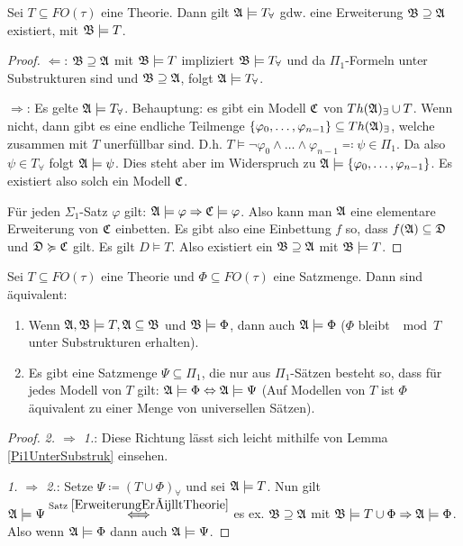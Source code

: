 \begin{satz}
	Sei $T\subseteq FO(\tau)$ eine Theorie. Dann gilt $\mathfrak{A}\models T_\forall$ gdw. eine Erweiterung $\mathfrak{B}\supseteq\mathfrak{A}$ existiert, mit $\mathfrak{B}\models T$.
	\label{ErweiterungErülltTheorie}
\end{satz}
\begin{proof}
	$\Leftarrow$: $\mathfrak{B}\supseteq\mathfrak{A}$ mit $\mathfrak{B}\models T$ impliziert $\mathfrak{B}\models T_\forall$ und da $\Pi_1$-Formeln unter Substrukturen sind und $\mathfrak{B}\supseteq\mathfrak{A}$, folgt $\mathfrak{A}\models T_\forall$.
	
	$\Rightarrow$: Es gelte $\mathfrak{A}\models T_\forall$. Behauptung: es gibt ein Modell $\mathfrak{C}$ von $Th(\mathfrak{A})_\exists\cup T$. Wenn nicht, dann gibt es eine endliche Teilmenge $\{\varphi_0,\dots,\varphi_{n-1}\}\subseteq Th(\mathfrak{A})_\exists$, welche zusammen mit $T$ unerfüllbar sind. D.h. $T\models \neg\varphi_0\land\dots\land\varphi_{n-1}\eqqcolon\psi\in\Pi_1$. Da also $\psi\in T_\forall$ folgt $\mathfrak{A}\models\psi$. Dies steht aber im Widerspruch zu $\mathfrak{A}\models\{\varphi_0,\dots,\varphi_{n-1}\}$. Es existiert also solch ein Modell $\mathfrak{C}$.
	
	Für jeden $\Sigma_1$-Satz $\varphi$ gilt: $\mathfrak{A}\models\varphi\Rightarrow\mathfrak{C}\models\varphi$. Also kann man $\mathfrak{A}$ eine elementare Erweiterung von $\mathfrak{C}$ einbetten. Es gibt also eine Einbettung $f$ so, dass $f(\mathfrak{A})\subseteq\mathfrak{D}$ und $\mathfrak{D}\succcurlyeq\mathfrak{C}$ gilt. Es gilt $D\models T$. Also existiert ein $\mathfrak{B}\supseteq\mathfrak{A}$ mit $\mathfrak{B}\models T$.
\end{proof}

\begin{satz}[\L o\'{s}-Tarski]
	Sei $T\subseteq FO(\tau)$ eine Theorie und $\Phi\subseteq FO(\tau)$ eine Satzmenge.
	Dann sind äquivalent:
	\begin{enumerate}
		\item Wenn $\mathfrak{A},\mathfrak{B}\models T,\mathfrak{A}\subseteq\mathfrak{B}$ und $\mathfrak{B}\models\Phi$, dann auch $\mathfrak{A}\models\Phi$ ($\Phi$ bleibt $\mod T$ unter Substrukturen erhalten).
		\item Es gibt eine Satzmenge $\Psi\subseteq\Pi_1$, die nur aus $\Pi_1$-Sätzen besteht so, dass für jedes Modell von $T$ gilt: $\mathfrak{A}\models\Phi\Leftrightarrow\mathfrak{A}\models\Psi$ (Auf Modellen von $T$ ist $\Phi$ äquivalent zu einer Menge von universellen Sätzen).
	\end{enumerate}
\end{satz}
\begin{proof}
	\textit{2. $\Rightarrow$ 1.}: Diese Richtung lässt sich leicht mithilfe von Lemma \ref{Pi1UnterSubstruk} einsehen.
	
	\textit{1. $\Rightarrow$ 2.}: Setze $\Psi\coloneqq(T\cup\Phi)_\forall$ und sei $\mathfrak{A}\models T$.
	Nun gilt $\mathfrak{A}\models\Psi \overset{\text{Satz }\ref{ErweiterungErülltTheorie}}{\Longleftrightarrow}$ es ex. $\mathfrak{B}\supseteq\mathfrak{A}$ mit $\mathfrak{B}\models T\cup \Phi \Rightarrow\mathfrak{A}\models\Phi$. Also wenn $\mathfrak{A}\models\Phi$ dann auch $\mathfrak{A}\models\Psi$.
\end{proof}


